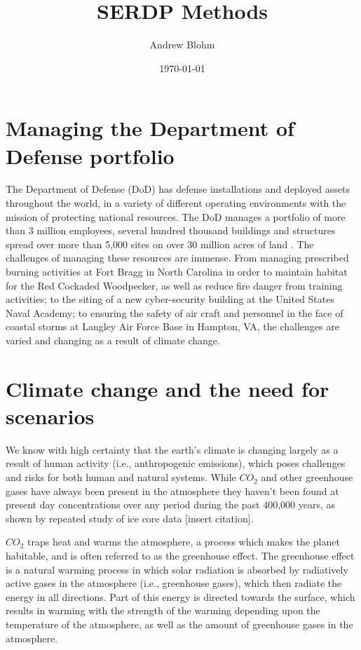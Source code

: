 \documentclass[10pt]{amsart}
\title{SERDP Methods}
\author{Andrew Blohm}
\date{\today}
\begin{document}
\maketitle

\section{Managing the Department of Defense portfolio}
The Department of Defense (DoD) has defense installations and deployed assets throughout the world, in a variety of different operating environments with the mission of protecting national resources.
The DoD manages a portfolio of more than 3 million employees, several hundred thousand buildings and structures spread over more than 5,000 sites on over 30 million acres of land \parencite{dodassets2016}.
The challenges of managing these resources are immense.
From managing prescribed burning activities at Fort Bragg in North Carolina in order to maintain habitat for the Red Cockaded Woodpecker, as well as reduce fire danger from training activities; to the siting of a new cyber-security building at the United States Naval Academy; to ensuring the safety of air craft and personnel in the face of coastal storms at Langley Air Force Base in Hampton, VA, the challenges are varied and changing as a result of climate change.

\section{Climate change and the need for scenarios}
We know with high certainty that the earth's climate is changing largely as a result of human activity (i.e., anthropogenic emissions), which poses challenges and risks for both human and natural systems.
While $CO_2$ and other greenhouse gases have always been present in the atmosphere they haven't been found at present day concentrations over any period during the past 400,000 years, as shown by repeated study of ice core data \parencite{}[insert citation].

$CO_2$ traps heat and warms the atmosphere, a process which makes the planet habitable, and is often referred to as the greenhouse effect. 
The greenhouse effect is a natural warming process in which solar radiation is absorbed by radiatively active gases in the atmosphere (i.e., greenhouse gases), which then radiate the energy in all directions.
Part of this energy is directed towards the surface, which results in warming with the strength of the warming depending upon the temperature of the atmosphere, as well as the amount of greenhouse gases in the atmosphere.
\end{document}
